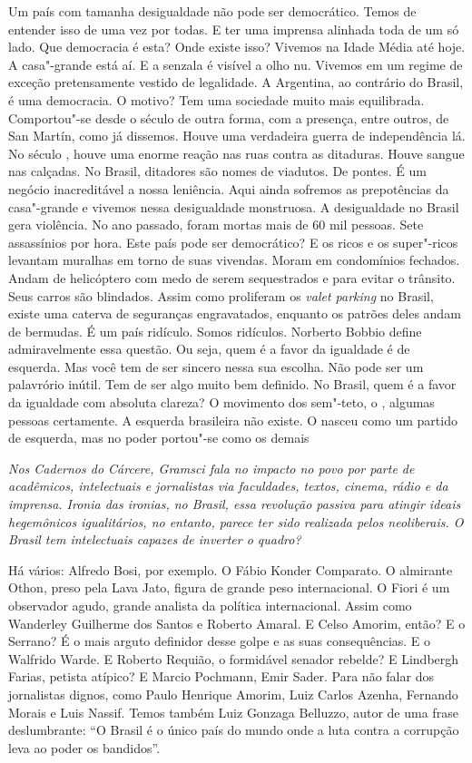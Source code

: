 \normalfont
Um país com tamanha desigualdade não pode ser
democrático. Temos de entender isso de uma vez por todas. E ter uma
imprensa alinhada toda de um só lado. Que democracia é esta? Onde existe
isso? Vivemos na Idade Média até hoje. A casa"-grande está aí. E a
senzala é visível a olho nu. Vivemos em um regime de exceção
pretensamente vestido de legalidade. A Argentina, ao contrário do
Brasil, é uma democracia. O motivo? Tem uma sociedade muito mais
equilibrada. Comportou"-se desde o século  de outra forma, com a
presença, entre outros, de San Martín, como já dissemos. Houve uma
verdadeira guerra de independência lá. No século , houve uma enorme
reação nas ruas contra as ditaduras. Houve sangue nas calçadas. No
Brasil, ditadores são nomes de viadutos. De pontes. É um negócio
inacreditável a nossa leniência. Aqui ainda sofremos as prepotências da
casa"-grande e vivemos nessa desigualdade monstruosa. A desigualdade no
Brasil gera violência. No ano passado, foram mortas mais de 60 mil
pessoas. Sete assassínios por hora. Este país pode ser democrático? E os
ricos e os super"-ricos levantam muralhas em torno de suas vivendas.
Moram em condomínios fechados. Andam de helicóptero com medo de serem
sequestrados e para evitar o trânsito. Seus carros são blindados. Assim
como proliferam os \emph{valet parking} no Brasil, existe uma caterva de
seguranças engravatados, enquanto os patrões deles andam de bermudas. É
um país ridículo. Somos ridículos. Norberto Bobbio define admiravelmente
essa questão. Ou seja, quem é a favor da igualdade é de esquerda. Mas
você tem de ser sincero nessa sua escolha. Não pode ser um palavrório
inútil. Tem de ser algo muito bem definido. No Brasil, quem é a favor da
igualdade com absoluta clareza? O movimento dos sem"-teto, o , algumas
pessoas certamente. A esquerda brasileira não existe. O  nasceu como
um partido de esquerda, mas no poder portou"-se como os demais

\itshape
 Nos \emph{Cadernos do Cárcere}, Gramsci fala no impacto
no povo por parte de acadêmicos, intelectuais e jornalistas via
faculdades, textos, cinema, rádio e da imprensa. Ironia das ironias, no
Brasil, essa revolução passiva para atingir ideais hegemônicos
igualitários, no entanto, parece ter sido realizada pelos neoliberais. O
Brasil tem intelectuais capazes de inverter o quadro?

\normalfont
Há vários: Alfredo Bosi, por exemplo. O Fábio Konder
Comparato. O almirante Othon, preso pela Lava Jato, figura de grande
peso internacional. O Fiori é um observador agudo, grande analista da
política internacional. Assim como Wanderley Guilherme dos Santos e
Roberto Amaral. E Celso Amorim, então? E o Serrano? É o mais arguto
definidor desse golpe e as suas consequências. E o Walfrido Warde. E
Roberto Requião, o formidável senador rebelde? E Lindbergh Farias,
petista atípico? E Marcio Pochmann, Emir Sader. Para não falar dos
jornalistas dignos, como Paulo Henrique Amorim, Luiz Carlos Azenha,
Fernando Morais e Luis Nassif. Temos também Luiz Gonzaga Belluzzo, autor
de uma frase deslumbrante: ``O Brasil é o único país do mundo onde a
luta contra a corrupção leva ao poder os bandidos''.

